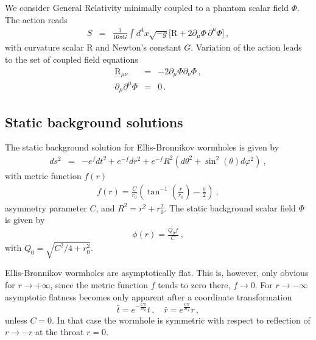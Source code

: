 \documentclass[aps,prd,12pt,superscriptaddress]{revtex4-2}
\begin{document}
We consider General Relativity minimally coupled to a phantom scalar field $\Phi$.
The action reads
\begin{eqnarray}
			S &=& \frac{1}{16 \pi G}\int d^4x \sqrt{-g} 
		\Big[\mathrm{R} + 2 \partial_\mu \Phi \, \partial^\mu \Phi 
		 \Big] \, ,
   \label{eq:ellis} 
\end{eqnarray}
with curvature scalar $\mathrm{R}$ and Newton's constant $G$.
Variation of the action leads to the set of coupled field equations
\begin{eqnarray}
    \mathrm{R}_{\mu\nu} &=& -2 \partial_{\mu}\Phi\partial_{\nu}\Phi \, , 
    \label{m_eqs}  \\
    \partial_{\mu}\partial^{\mu}\Phi &=& 0 \, .
    \label{s_eq}
\end{eqnarray}

\subsection{Static background solutions}

The static background solution for Ellis-Bronnikov wormholes is given by
\begin{eqnarray}
ds^2 &=& -e^{f} dt^2 
+ e^{-f} dr^2 + {e^{-f}} R^2 \left(
d\theta^2+\sin^2{(\theta)}d\varphi^2 \right) \ ,
\label{metric_b}
\end{eqnarray}
with metric function $f(r)$
\begin{eqnarray}
    f(r) = \frac{{C}}{r_0} \left(\tan^{-1} \! \left(\frac{r}{r_0}\right)-\frac{\pi}{2}\right) \ ,
\end{eqnarray}
asymmetry parameter $C$, and $R^2=r^2+r_0^2$.
The static background scalar field $\Phi$ is given by
\begin{eqnarray}
  \phi(r)= \frac{Q_0 f}{C} \ ,
\end{eqnarray}
with 
$Q_{0} = \sqrt{C^2/4 + r_0^2}$.

Ellis-Bronnikov wormholes are asymptotically flat.
This is, however, only obvious for $r \rightarrow +\infty$, since the metric function $f$ tends to zero there, $f \rightarrow 0$. 
For $r \rightarrow -\infty$ asymptotic flatness becomes only apparent after a coordinate transformation
 \begin{equation} \label{coor_trans}
  \bar{t} = e^{-\frac{C \pi}{2 r_0}} t \,, \quad \bar{r} = e^{\frac{C \pi}{2 r_0}} r \, ,
 \end{equation}
unless $C=0$.
In that case the wormhole is symmetric with respect to reflection of $r \to -r$ at the throat $r=0$.
 
\end{document}
